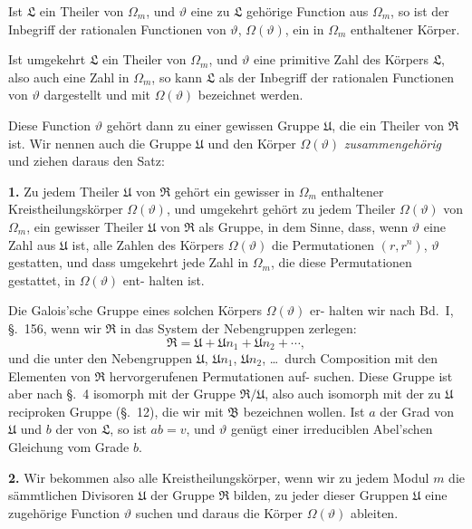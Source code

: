 \documentclass[12pt,a4paper]{article}
\theoremstyle{plain}
\theoremstyle{definition}
\theoremstyle{remark}
\begin{document}
Ist $\mathfrak{L}$ ein Theiler von $\Omega_m$, und $\vartheta$ eine zu $\mathfrak{L}$ gehörige Function
aus $\Omega_m$, so ist der Inbegriff der rationalen Functionen von $\vartheta$,
$\Omega(\vartheta)$, ein in $\Omega_m$ enthaltener Körper.

Ist umgekehrt $\mathfrak{L}$ ein Theiler von $\Omega_m$, und $\vartheta$ eine primitive
Zahl des Körpers $\mathfrak{L}$, also auch eine Zahl in $\Omega_m$, so kann $\mathfrak{L}$ als
der Inbegriff der rationalen Functionen von $\vartheta$ dargestellt und
mit $\Omega(\vartheta)$ bezeichnet werden.

Diese Function $\vartheta$ gehört dann zu einer gewissen Gruppe $\mathfrak{U}$,
die ein Theiler von $\mathfrak{R}$ ist. Wir nennen auch die Gruppe $\mathfrak{U}$ und
den Körper $\Omega(\vartheta)$ \emph{zusammengehörig} und ziehen daraus den
Satz:

\textbf{1.} Zu jedem Theiler $\mathfrak{U}$ von $\mathfrak{R}$ gehört ein gewisser
in $\Omega_m$ enthaltener Kreistheilungskörper $\Omega(\vartheta)$, und
umgekehrt gehört zu jedem Theiler $\Omega(\vartheta)$ von $\Omega_m$,
ein gewisser Theiler $\mathfrak{U}$ von $\mathfrak{R}$ als Gruppe, in dem
Sinne, dass, wenn $\vartheta$ eine Zahl aus $\mathfrak{U}$ ist, alle
Zahlen des Körpers $\Omega(\vartheta)$ die Permutationen $(r, r^n)$,
$\vartheta$ gestatten, und dass umgekehrt jede Zahl in $\Omega_m$,
die diese Permutationen gestattet, in $\Omega(\vartheta)$ ent-
halten ist.

Die Galois'sche Gruppe eines solchen Körpers $\Omega(\vartheta)$ er-
halten wir nach Bd.~I, \S.~156, wenn wir $\mathfrak{R}$ in das System der
Nebengruppen zerlegen:
\[
\mathfrak{R} = \mathfrak{U} + \mathfrak{U} n_1 + \mathfrak{U} n_2 + \cdots,
\]
und die unter den Nebengruppen $\mathfrak{U}$, $\mathfrak{U} n_1$, $\mathfrak{U} n_2$, \ldots\ durch Composition
mit den Elementen von $\mathfrak{R}$ hervorgerufenen Permutationen auf-
suchen. Diese Gruppe ist aber nach \S.~4 isomorph mit der
Gruppe $\mathfrak{R}/\mathfrak{U}$, also auch isomorph mit der zu $\mathfrak{U}$ reciproken Gruppe
(\S.~12), die wir mit $\mathfrak{B}$ bezeichnen wollen. Ist $a$ der Grad von $\mathfrak{U}$
und $b$ der von $\mathfrak{L}$, so ist $ab = v$, und $\vartheta$ genügt einer irreduciblen
Abel'schen Gleichung vom Grade $b$.

\textbf{2.} Wir bekommen also alle Kreistheilungskörper,
wenn wir zu jedem Modul $m$ die sämmtlichen
Divisoren $\mathfrak{U}$ der Gruppe $\mathfrak{R}$ bilden, zu jeder dieser
Gruppen $\mathfrak{U}$ eine zugehörige Function $\vartheta$ suchen
und daraus die Körper $\Omega(\vartheta)$ ableiten.
\end{document}
